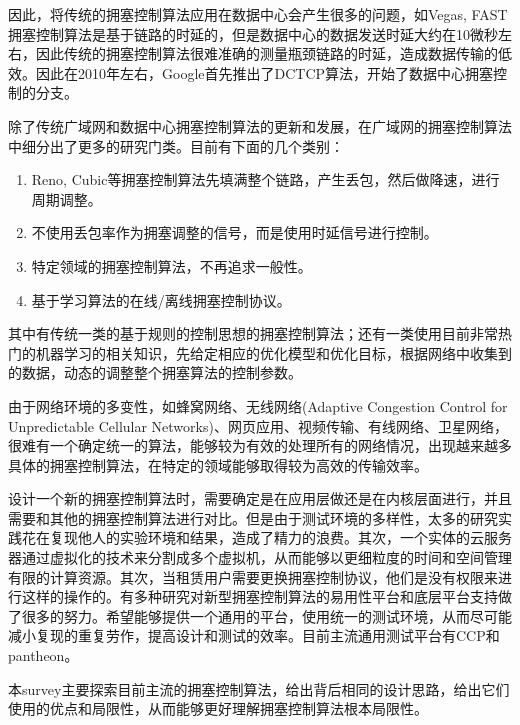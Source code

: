 \documentclass[a4paper, 12pt, UTF8]{ctexart}
\begin{document}
\par 因此，将传统的拥塞控制算法应用在数据中心会产生很多的问题，如Vegas, FAST拥塞控制算法是基于链路的时延的，但是数据中心的数据发送时延大约在10微秒左右，因此传统的拥塞控制算法很难准确的测量瓶颈链路的时延，造成数据传输的低效。因此在2010年左右，Google首先推出了DCTCP算法，开始了数据中心拥塞控制的分支。

\par 除了传统广域网和数据中心拥塞控制算法的更新和发展，在广域网的拥塞控制算法中细分出了更多的研究门类。目前有下面的几个类别：
\begin{enumerate}
	\item Reno, Cubic等拥塞控制算法先填满整个链路，产生丢包，然后做降速，进行周期调整。
	\item 不使用丢包率作为拥塞调整的信号，而是使用时延信号进行控制。
	\item 特定领域的拥塞控制算法，不再追求一般性。
	\item 基于学习算法的在线/离线拥塞控制协议。
\end{enumerate}
\par 其中有传统一类的基于规则的控制思想的拥塞控制算法；还有一类使用目前非常热门的机器学习的相关知识，先给定相应的优化模型和优化目标，根据网络中收集到的数据，动态的调整整个拥塞算法的控制参数。

\par 由于网络环境的多变性，如蜂窝网络、无线网络(Adaptive Congestion Control for Unpredictable Cellular Networks)、网页应用、视频传输、有线网络、卫星网络，很难有一个确定统一的算法，能够较为有效的处理所有的网络情况，出现越来越多具体的拥塞控制算法，在特定的领域能够取得较为高效的传输效率。

\par 设计一个新的拥塞控制算法时，需要确定是在应用层做还是在内核层面进行，并且需要和其他的拥塞控制算法进行对比。但是由于测试环境的多样性，太多的研究实践花在复现他人的实验环境和结果，造成了精力的浪费。其次，一个实体的云服务器通过虚拟化的技术来分割成多个虚拟机，从而能够以更细粒度的时间和空间管理有限的计算资源。其次，当租赁用户需要更换拥塞控制协议，他们是没有权限\cite{DBLP:conf/sigcomm/HeRAGFCA16}来进行这样的操作的。有多种研究对新型拥塞控制算法的易用性平台和底层平台\cite{DBLP:conf/usenix/YanMHRWLW18}支持做了很多的努力。希望能够提供一个通用的平台，使用统一的测试环境，从而尽可能减小复现的重复劳作，提高设计和测试的效率。目前主流通用测试平台有CCP和pantheon。

\par 本survey主要探索目前主流的拥塞控制算法，给出背后相同的设计思路，给出它们使用的优点和局限性，从而能够更好理解拥塞控制算法根本局限性。
\end{document}

